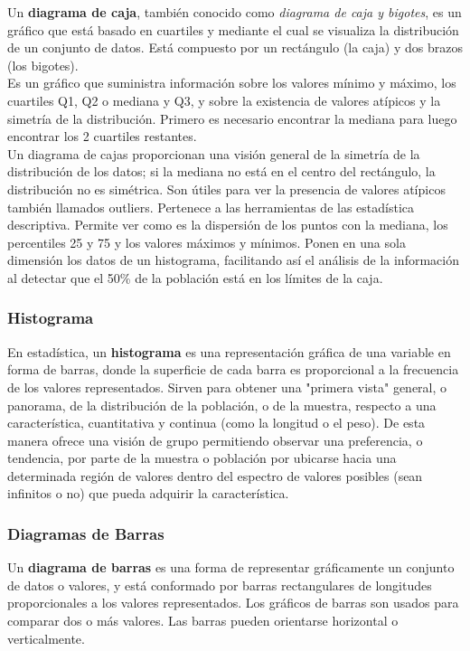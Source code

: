 \documentclass[osajnl,twocolumn,showpacs,superscriptaddress,10pt]{revtex4-1} %
\begin{document}
Un \textbf{diagrama de caja}, también conocido como \textit{diagrama de caja y bigotes}, es un gráfico que está basado en cuartiles y mediante el cual se visualiza la distribución de un conjunto de datos. Está compuesto por un rectángulo (la caja) y dos brazos (los bigotes). \\

Es un gráfico que suministra información sobre los valores mínimo y máximo, los cuartiles Q1, Q2 o mediana y Q3, y sobre la existencia de valores atípicos y la simetría de la distribución. Primero es necesario encontrar la mediana para luego encontrar los 2 cuartiles restantes. \\

Un diagrama de cajas proporcionan una visión general de la simetría de la distribución de los datos; si la mediana no está en el centro del rectángulo, la distribución no es simétrica. Son útiles para ver la presencia de valores atípicos también llamados outliers. Pertenece a las herramientas de las estadística descriptiva. Permite ver como es la dispersión de los puntos con la mediana, los percentiles 25 y 75 y los valores máximos y mínimos. Ponen en una sola dimensión los datos de un histograma, facilitando así el análisis de la información al detectar que el 50\% de la población está en los límites de la caja.

\subsubsection{Histograma}

En estadística, un \textbf{histograma} es una representación gráfica de una variable en forma de barras, donde la superficie de cada barra es proporcional a la frecuencia de los valores representados. Sirven para obtener una "primera vista" general, o panorama, de la distribución de la población, o de la muestra, respecto a una característica, cuantitativa y continua (como la longitud o el peso). De esta manera ofrece una visión de grupo permitiendo observar una preferencia, o tendencia, por parte de la muestra o población por ubicarse hacia una determinada región de valores dentro del espectro de valores posibles (sean infinitos o no) que pueda adquirir la característica.

\subsubsection{Diagramas de Barras}

Un \textbf{diagrama de barras} es una forma de representar gráficamente un conjunto de datos o valores, y está conformado por barras rectangulares de longitudes proporcionales a los valores representados. Los gráficos de barras son usados para comparar dos o más valores. Las barras pueden orientarse horizontal o verticalmente.
\end{document}
